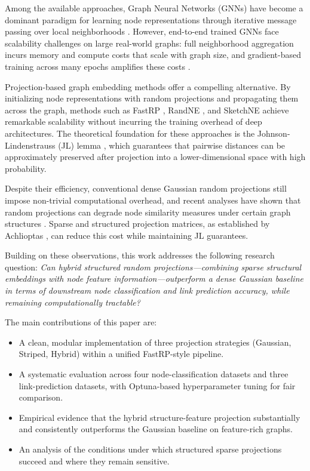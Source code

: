 \documentclass[conference]{IEEEtran}
\begin{document}
Among the available approaches, Graph Neural Networks (GNNs) have become a
dominant paradigm for learning node representations through iterative message
passing over local neighborhoods \cite{khemani2024}. However, end-to-end
trained GNNs face scalability challenges on large real-world graphs: full
neighborhood aggregation incurs memory and compute costs that scale with
graph size, and gradient-based training across many epochs amplifies these
costs \cite{bui2023rap}.

Projection-based graph embedding methods offer a compelling alternative. By
initializing node representations with random projections and propagating
them across the graph, methods such as FastRP \cite{chen2019fast}, RandNE
\cite{zhang2018randne}, and SketchNE \cite{xie2023sketchne} achieve
remarkable scalability without incurring the training overhead of deep
architectures. The theoretical foundation for these approaches is the
Johnson-Lindenstrauss (JL) lemma \cite{johnson1984}, which guarantees that
pairwise distances can be approximately preserved after projection into a
lower-dimensional space with high probability.

Despite their efficiency, conventional dense Gaussian random projections
still impose non-trivial computational overhead, and recent analyses have
shown that random projections can degrade node similarity measures under
certain graph structures \cite{tadic2024}. Sparse and structured projection
matrices, as established by Achlioptas \cite{achlioptas2003}, can reduce
this cost while maintaining JL guarantees.

Building on these observations, this work addresses the following research
question: \emph{Can hybrid structured random projections---combining sparse
structural embeddings with node feature information---outperform a dense
Gaussian baseline in terms of downstream node classification and link
prediction accuracy, while remaining computationally tractable?}

The main contributions of this paper are:
\begin{itemize}
    \item A clean, modular implementation of three projection strategies
          (Gaussian, Striped, Hybrid) within a unified FastRP-style pipeline.
    \item A systematic evaluation across four node-classification datasets
          and three link-prediction datasets, with Optuna-based
          hyperparameter tuning for fair comparison.
    \item Empirical evidence that the hybrid structure-feature projection
          substantially and consistently outperforms the Gaussian baseline on
          feature-rich graphs.
    \item An analysis of the conditions under which structured sparse
          projections succeed and where they remain sensitive.
\end{itemize}
\end{document}

